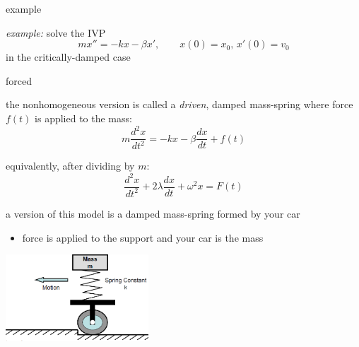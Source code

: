 \documentclass[urlcolor=blue,dvipsnames]{beamer}
\begin{document}
\begin{frame}{example}

\noindent \emph{example:} solve the IVP
    $$mx'' = -kx - \beta x', \qquad x(0) = x_0, \, x'(0) = v_0$$
in the critically-damped case

\vspace{50mm}
\end{frame}


\begin{frame}{forced}

\begin{itemize}
\item the nonhomogeneous version is called a \emph{driven}, damped mass-spring where force $f(t)$ is applied to the mass:
    $$m \frac{d^2x}{dt^2} = - k x - \beta \frac{dx}{dt} + f(t)$$
\item equivalently, after dividing by $m$:
    $$\frac{d^2x}{dt^2} + 2 \lambda \frac{dx}{dt} + \omega^2 x=F(t)$$

\begin{minipage}[t]{0.5\textwidth}
\item a version of this model is a damped mass-spring formed by your car
    \begin{itemize}
    \item force is applied to the support and your car is the mass
    \end{itemize}
\end{minipage}
\end{itemize}

\vspace{-20mm}
\hfill \includegraphics[width=0.4\textwidth]{figs/carbump}
\end{frame}
\end{document}
